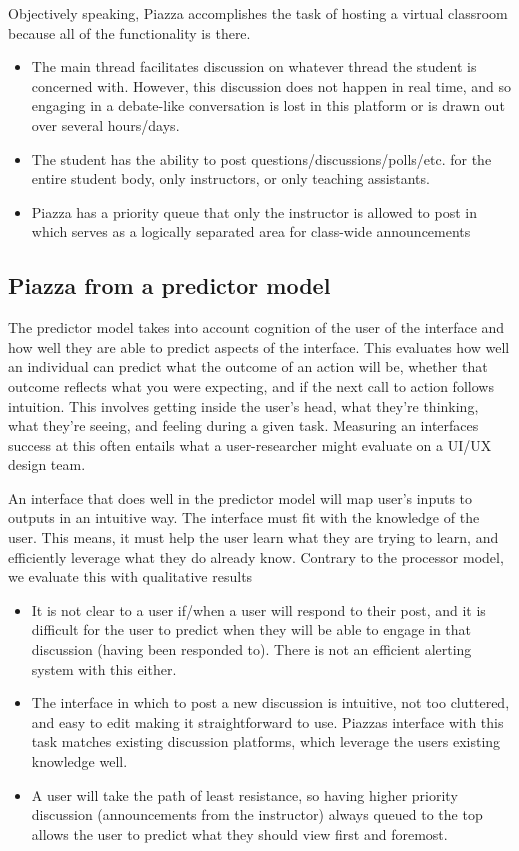 Objectively speaking, Piazza accomplishes the task of hosting a virtual classroom because all of the functionality is there.

\clearpage

\begin{itemize}
\item
  The main thread facilitates discussion on whatever thread the student is concerned with. However, this discussion does not happen in real time, and so engaging in a debate-like conversation is lost in this platform or is drawn out over several hours/days.
\item
  The student has the ability to post questions/discussions/polls/etc. for the entire student body, only instructors, or only teaching assistants.
\item
  Piazza has a priority queue that only the instructor is allowed to post in which serves as a logically separated area for class-wide announcements
\end{itemize}

\subsection{Piazza from a predictor model}

The predictor model takes into account cognition of the user of the interface and how well they are able to predict aspects of the interface. This evaluates how well an individual can predict what the outcome of an action will be, whether that outcome reflects what you were expecting, and if the next call to action follows intuition. This involves getting inside the user's head, what they're thinking, what they're seeing, and feeling during a given task. Measuring an interfaces success at this often entails what a user-researcher might evaluate on a UI/UX design team.

An interface that does well in the predictor model will map user's inputs to outputs in an intuitive way. The interface must fit with the knowledge of the user. This means, it must help the user learn what they are trying to learn, and efficiently leverage what they do already know. Contrary to the processor model, we evaluate this with qualitative results

\begin{itemize}
\item
  It is not clear to a user if/when a user will respond to their post, and it is difficult for the user to predict when they will be able to engage in that discussion (having been responded to). There is not an efficient alerting system with this either.
\item
  The interface in which to post a new discussion is intuitive, not too cluttered, and easy to edit making it straightforward to use. Piazzas interface with this task matches existing discussion platforms, which leverage the users existing knowledge well.
\item
  A user will take the path of least resistance, so having higher priority discussion (announcements from the instructor) always queued to the top allows the user to predict what they should view first and foremost.
\end{itemize}

